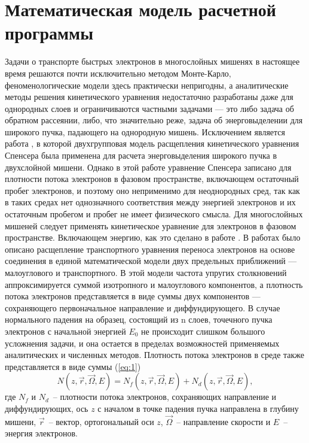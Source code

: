 \chapter{Математическая модель расчетной программы}
Задачи о транспорте быстрых электронов в многослойных мишенях в настоящее
время решаются почти исключительно методом Монте-Карло, феноменологические
модели здесь практически непригодны, а аналитические методы решения кинетического
уравнения недостаточно разработаны даже для однородных слоев и ограничиваются
частными задачами — это либо задача об обратном рассеянии, либо, что значительно
реже, задача об энерговыделении для широкого пучка, падающего на однородную
мишень. Исключением является работа \cite{zheng-ming}, в которой двухгрупповая
модель расщепления кинетического уравнения Спенсера была применена для расчета
энерговыделения широкого пучка в двухслойной мишени. Однако в этой работе
уравнение Спенсера записано для плотности потока электронов в фазовом пространстве,
включающем остаточный пробег электронов, и поэтому оно неприменимо для
неоднородных сред, так как в таких средах нет однозначного соответствия между
энергией электронов и их остаточным пробегом и пробег не имеет физического смысла.
Для многослойных мишеней следует применять кинетическое уравнение для электронов в
фазовом пространстве. Включающем энергию, как это сделано в работе \cite{smolar}.
В работах \cite{mikheev,smolar1,smolar2} было описано расщепление транспортного
уравнения переноса электронов на основе соединения в единой математической модели
двух предельных приближений — малоуглового и транспортного. В этой модели частота
упругих столкновений аппроксимируется суммой изотропного и малоуглового
компонентов, а плотность потока электронов представляется в виде суммы двух
компонентов — сохраняющего первоначальное направление и диффундирующего.
В случае нормального падения на образец, состоящий из n слоев, точечного пучка
электронов с начальной энергией $E_0$ не происходит слишком большого усложнения
задачи, и она остается в пределах возможностей применяемых аналитических и
численных методов. Плотность потока электронов в среде также представляется в виде
суммы (\ref{eq:1})
\begin{equation}
N(z,\vec{r},\vec{\Omega},E)=N_f (z,\vec{r},\vec{\Omega},E)+N_d (z,\vec{r},\vec{\Omega},E),
\label{eq:1}
\end{equation}
где $N_f$ и $N_d$~-- плотности потока электронов, сохраняющих направление и
диффундирующих, ось $z$ с началом в точке падения пучка направлена в глубину мишени,
$\vec{r}$~-- вектор, ортогональный оси $z$, $\vec{\Omega}$~-- направление скорости и $E$~-- энергия электронов.
